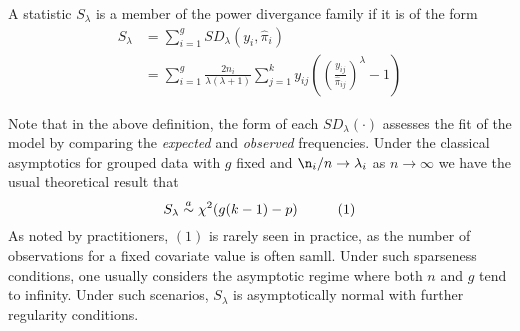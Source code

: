 \begin{definition}
    A statistic $S_\lambda$ is a member of the power divergance family if it is of the form 
    \begin{align*}
        S_\lambda &= \sum_{i=1}^{g}SD_\lambda(y_i , \hat{\pi}_i) \\
        &= \sum_{i=1}^{g}\frac{2n_i}{\lambda(\lambda+1)}\sum_{j=1}^{k}y_{ij}\left(\left(\frac{y_{ij}}{\hat{\pi}_{ij}}\right)^\lambda-1\right)
    \end{align*}
\end{definition}
Note that in the above definition, the form of each $SD_\lambda(\cdot)$ assesses the fit of the model by comparing the \textit{expected} and \textit{observed} frequencies. Under the classical asymptotics for grouped data with $g$ fixed and $\n_i/n\to\lambda_i$ as $n\to\infty$ we have the usual theoretical result that 
$$S_\lambda \stackrel{a}{\sim}\chi^2(g(k-1)-p) \hspace{10mm} (1)$$
As noted by practitioners, $(1)$ is rarely seen in practice, as the number of observations for a fixed covariate value is often samll. Under such sparseness conditions, one usually considers the asymptotic regime where both $n$ and $g$ tend to infinity. Under such scenarios, $S_\lambda$ is asymptotically normal with further regularity conditions.

